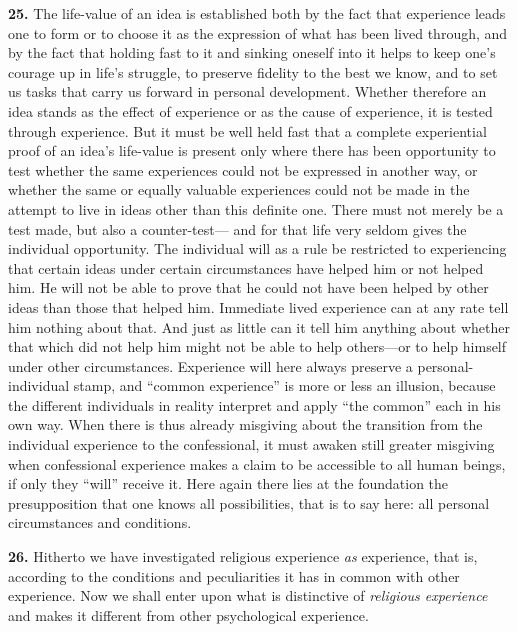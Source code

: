 \documentclass[12pt,a4paper]{book}
\newcommand{\opage}[1]{\marginnote{\footnotesize\textit{[#1]}}}
\begin{document}
\medskip

\noindent\textbf{25.} The life-value of an idea is established both by the fact
that experience leads one to form or to choose it as the expression of what has
been lived through, and by the fact that holding fast to it and sinking oneself
into it helps to keep one's courage up in life's struggle, to preserve fidelity
to the best we know, and to set us tasks that carry us forward in personal
development. Whether therefore an idea stands as the effect of experience or as
the cause of experience, it is tested through experience. But it must be well
held fast that a complete experiential proof of an idea's life-value is present
only where there has been opportunity to test whether the same experiences
could not be expressed in another way, or whether the same or equally valuable
experiences could not be made in the attempt to live in ideas other than this
definite one. There must not merely be a test made, but also a counter-test---
and for that life very seldom gives the individual opportunity. The individual
will as a rule be restricted to experiencing that certain ideas under certain
circumstances have helped him or not helped him. He will not be able to prove
that he could not have been helped by other ideas than those that helped him.
Immediate lived experience can at any rate tell him nothing about that. And
just as little can it tell him anything about whether that which did not help
him might not be able to help others---or to help himself under other
circumstances. Experience will here always preserve a personal-individual
stamp, and ``common experience'' is more or less an illusion, because the
different individuals in reality interpret and apply ``the common'' each in his
own way. When there is thus already misgiving about the transition from the
individual experience to the confessional, it must awaken still greater
misgiving when confessional experience makes a claim to be accessible to all
human beings, if only they ``will'' receive it. Here again there lies at the
foundation the presupposition that one knows all possibilities, that is to say
here: all personal circumstances and conditions.

\medskip

\noindent\textbf{26.} Hitherto we have investigated religious experience
\emph{as} experience, that is, according to the conditions and peculiarities it
has in common 
\opage{62}with other experience. Now we shall enter upon what is
distinctive of \emph{religious experience} and makes it different from other
psychological experience.
\end{document}
